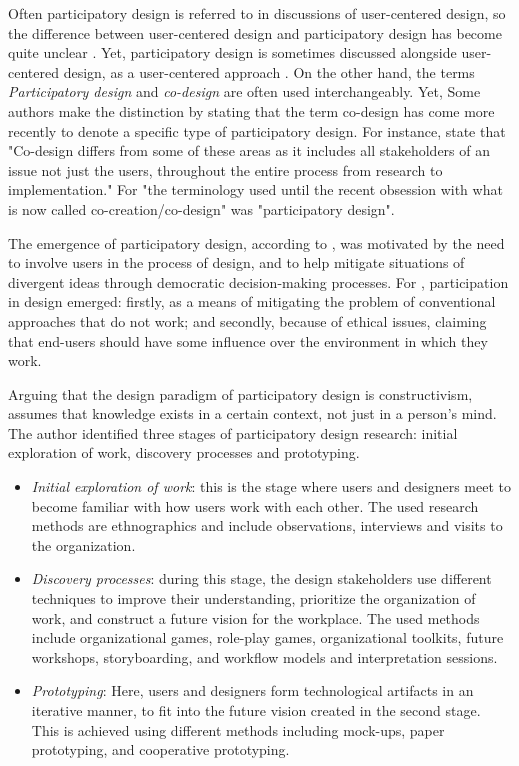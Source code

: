 \documentclass[manuscript,nonacm,12pt]{acmart}
\begin{document}
Often participatory design is referred to in discussions of user-centered design, so the difference between user-centered design and participatory design has become quite unclear \cite{bannon2018introduction}. Yet, participatory design is sometimes discussed alongside user-centered design, as a user-centered approach \cite{leng2018designing}.
On the other hand, the terms \textit{Participatory design} and \textit{co-design} are often used  interchangeably. Yet, Some authors make the distinction by stating that the term co-design has come more recently to denote a specific type of participatory design. For instance, \citet{szebeko2010co} state that "Co-design differs from some of these areas as it includes all stakeholders of an issue not just the users, throughout the entire process from research to implementation." For \citet{Sanders2008} "the terminology used until the recent obsession with what is now called co-creation/co-design" was "participatory design".

The emergence of participatory design, according to \citet{bannon2018introduction}, was motivated by the need to involve users in the process of design, and to help mitigate situations of divergent ideas through democratic decision-making processes. 
For \citet{dearnley1983favour}, participation in design emerged: firstly, as a means of mitigating the problem of conventional approaches that do not work; and secondly, because of ethical issues, claiming that end-users should have some influence over the environment in which they work.

Arguing that the design paradigm of participatory design is constructivism,\citet{spinuzzi2005methodology} assumes that knowledge exists in a certain context, not just in a person's mind. The author identified three stages of participatory design research: initial exploration of work, discovery processes and prototyping. 
\begin{itemize}
    \item \textit{Initial exploration of work}: this is the stage where users and designers meet to become familiar with how users work with each other. The used research methods are ethnographics and include observations, interviews and visits to the organization.
    \item \textit{Discovery processes}: during this stage, the design stakeholders use different techniques to improve their understanding, prioritize the organization of work, and construct a future vision for the workplace. The used methods include organizational games, role-play games, organizational toolkits, future workshops, storyboarding, and workflow models and interpretation sessions.
    \item \textit{Prototyping}: Here, users and designers form technological artifacts in an iterative manner, to fit into the future vision created in the second stage. This is achieved using different methods including mock-ups, paper prototyping, and cooperative prototyping.
\end{itemize}
\end{document}
